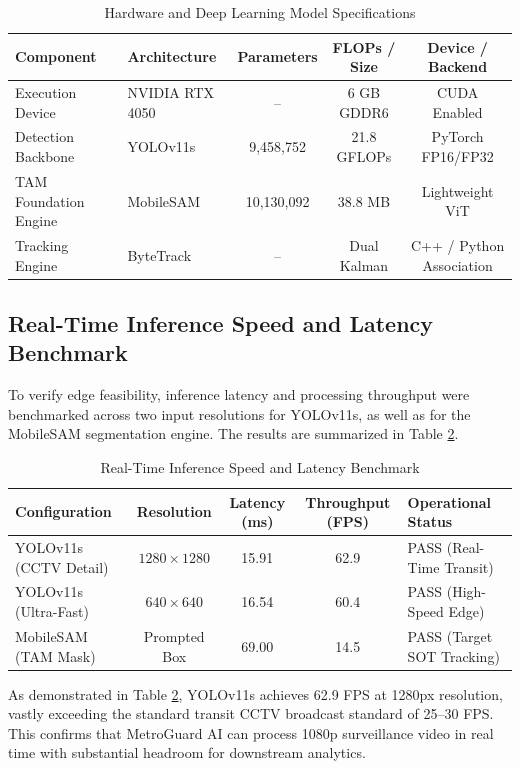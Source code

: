\documentclass[12pt,a4paper]{report}
\begin{document}
\begin{table}[H]
\centering
\caption{Hardware and Deep Learning Model Specifications}
\label{tab:model_specs}
\vspace*{5pt}
\begin{tabular}{|l|l|c|c|c|}
\hline
\textbf{Component} & \textbf{Architecture} & \textbf{Parameters} & \textbf{FLOPs / Size} & \textbf{Device / Backend} \\ \hline
Execution Device & NVIDIA RTX 4050 & -- & 6 GB GDDR6 & CUDA Enabled \\ \hline
Detection Backbone & YOLOv11s & 9,458,752 & 21.8 GFLOPs & PyTorch FP16/FP32 \\ \hline
TAM Foundation Engine & MobileSAM & 10,130,092 & 38.8 MB & Lightweight ViT \\ \hline
Tracking Engine & ByteTrack & -- & Dual Kalman & C++ / Python Association \\ \hline
\end{tabular}
\end{table}

\subsection{Real-Time Inference Speed and Latency Benchmark}
To verify edge feasibility, inference latency and processing throughput were benchmarked across two input resolutions for YOLOv11s, as well as for the MobileSAM segmentation engine. The results are summarized in Table \ref{tab:latency_bench}.

\begin{table}[H]
\centering
\caption{Real-Time Inference Speed and Latency Benchmark}
\label{tab:latency_bench}
\vspace*{5pt}
\begin{tabular}{|l|c|c|c|l|}
\hline
\textbf{Configuration} & \textbf{Resolution} & \textbf{Latency (ms)} & \textbf{Throughput (FPS)} & \textbf{Operational Status} \\ \hline
YOLOv11s (CCTV Detail) & $1280 \times 1280$ & 15.91 & 62.9 & PASS (Real-Time Transit) \\ \hline
YOLOv11s (Ultra-Fast) & $640 \times 640$ & 16.54 & 60.4 & PASS (High-Speed Edge) \\ \hline
MobileSAM (TAM Mask) & Prompted Box & 69.00 & 14.5 & PASS (Target SOT Tracking) \\ \hline
\end{tabular}
\end{table}

\noindent As demonstrated in Table \ref{tab:latency_bench}, YOLOv11s achieves 62.9 FPS at 1280px resolution, vastly exceeding the standard transit CCTV broadcast standard of 25--30 FPS. This confirms that MetroGuard AI can process 1080p surveillance video in real time with substantial headroom for downstream analytics.
\end{document}

